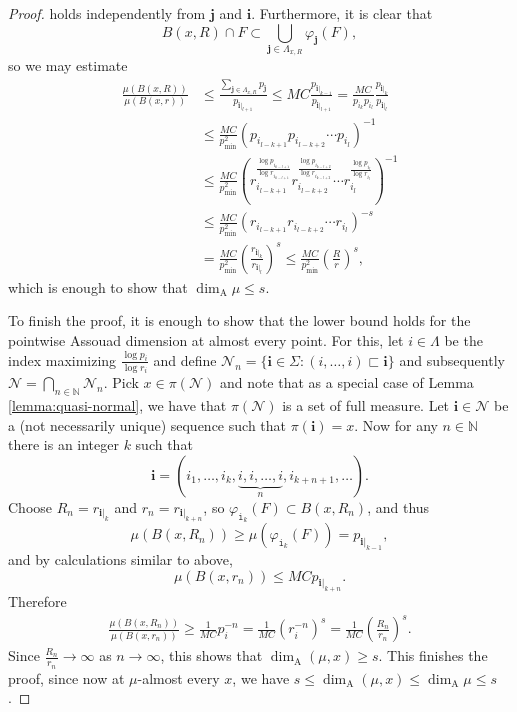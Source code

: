 \documentclass{PRM}
\newcommand{\field}[1]{\mathbb{#1}}
\newcommand{\N}{\field{N}}
\newcommand{\smalli}{\mathtt{i}}
\newcommand{\adim}{\dim_{\mathrm{A}}}
\theoremstyle{plain}
\theoremstyle{definition}
\theoremstyle{remark}
\begin{document}
\begin{proof}
holds independently from $\mathbf{j}$ and $\mathbf{i}$.
Furthermore, it is clear that
\begin{equation*}
    B(x,R)\cap F\subset\bigcup_{\mathbf{j}\in\Lambda_{x,R}}\varphi_{\mathbf{j}}(F),
\end{equation*}
so we may estimate
\begin{align*}
    \frac{\mu(B(x,R))}{\mu(B(x,r))}&\leq \frac{\sum_{\mathbf{j}\in\Lambda_{x,R}}p_{\mathbf{j}}}{p_{\mathbf{i}|_{l+1}}}\leq MC\frac{p_{\mathbf{i}|_{k-1}}}{p_{\mathbf{i}|_{l+1}}}=\frac{MC}{p_{i_k}p_{i_l}}\frac{p_{\mathbf{i}|_k}}{p_{\mathbf{i}|_l}}\\
    &\leq \frac{MC}{p_{\min}^2}\left(p_{i_{l-k+1}}p_{i_{l-k+2}}\cdots p_{i_l}\right)^{-1}\\
    &\leq \frac{MC}{p_{\min}^2}\left(r_{i_{l-k+1}}^{\frac{\log p_{i_{k-l+1}}}{\log r_{i_{k-l+1}}}}r_{i_{l-k+2}}^{\frac{\log p_{i_{k-l+2}}}{\log r_{i_{k-l+2}}}}\cdots r_{i_l}^{\frac{\log p_{i_{l}}}{\log r_{i_{l}}}}\right)^{-1}\\
    &\leq \frac{MC}{p_{\min}^2}\left(r_{i_{l-k+1}}r_{i_{l-k+2}}\cdots r_{i_l}\right)^{-s}\\&=\frac{MC}{p_{\min}^2}\left(\frac{r_{\mathbf{i}|_{k}}}{r_{\mathbf{i}|_l}}\right)^{s}
    \leq  \frac{MC}{p_{\min}^2}\left(\frac{R}{r}\right)^{s},
\end{align*}
which is enough to show that $\dim_{\mathrm{A}}\mu\leq s$.

To finish the proof, it is enough to show that the lower bound holds for the pointwise Assouad dimension at almost every point. For this, let $i\in\Lambda$ be the index maximizing $\frac{\log p_i}{\log r_i}$ and define $\mathcal{N}_n=\{\mathbf{i}\in\Sigma\colon (i,\ldots,i)\sqsubset \mathbf{i}\}$ and subsequently $\mathcal{N}=\bigcap_{n\in\N}\mathcal{N}_n$. Pick $x\in \pi(\mathcal{N})$ and note that as a special case of Lemma \ref{lemma:quasi-normal}, we have that $\pi(\mathcal{N})$ is a set of full measure. Let $\mathbf{i}\in \mathcal{N}$ be a (not necessarily unique) sequence such that $\pi(\mathbf{i})=x$. Now for any $n\in\N$ there is an integer $k$ such that
\begin{equation*}
    \mathbf{i}=(i_1,\ldots,i_k,\underbrace{i,i,\ldots,i}_n,i_{k+n+1},\ldots).
\end{equation*}
Choose $R_n = r_{\mathbf{i}|_{k}}$ and $r_n=r_{\mathbf{i}|_{k+n}}$, so $\varphi_{\smalli_{k}}(F)\subset B(x,R_n)$, and thus
\begin{equation*}
    \mu(B(x,R_n))\geq\mu(\varphi_{\smalli_{k}}(F))=p_{\mathbf{i}|_{k-1}},
\end{equation*}
and by calculations similar to above,
\begin{equation*}
    \mu(B(x,r_n))\leq MC p_{\mathbf{i}|_{k+n}}.
\end{equation*}
Therefore
\begin{align*}
    \frac{\mu(B(x,R_n))}{\mu(B(x,r_n))}\geq \frac{1}{MC}p_i^{-n}=\frac{1}{MC}(r_i^{-n})^{s}= \frac{1}{MC}\left(\frac{R_n}{r_n}\right)^{s}.
\end{align*}
Since $\frac{R_n}{r_n}\to\infty$ as $n\to \infty$, this shows that $\dim_{\mathrm{A}}(\mu,x)\geq s$. This finishes the proof, since now at $\mu$-almost every $x$, we have $s\leq \adim(\mu,x)\leq \adim\mu\leq s$.
\end{proof}
\end{document}
